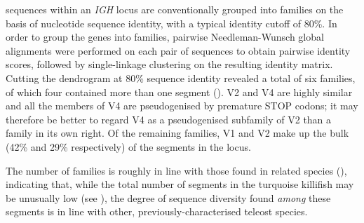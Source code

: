 	\vh sequences within an \textit{IGH} locus are conventionally grouped into families on the basis of nucleotide sequence identity, with a typical identity cutoff of 80\%. In order to group the \Nfu \vh genes into families, pairwise Needleman-Wunsch global alignments were performed on each pair of \vh sequences to obtain pairwise identity scores, followed by single-linkage clustering on the resulting identity matrix. Cutting the dendrogram at 80\% sequence identity revealed a total of six \vh families, of which four contained more than one \vh segment (). 	V2 and V4 are highly similar and all the members of V4 are pseudogenised by premature STOP codons; it may therefore be better to regard V4 as a pseudogenised subfamily of V2 than a \vh family in its own right. Of the remaining families, V1 and V2 make up the bulk (42\% and 29\% respectively) of the \vh segments in the locus. 
	
	The number of \vh families is roughly in line with those found in related species (), indicating that, while the total number of \vh segments in the turquoise killifish may be unusually low (see ), the degree of sequence diversity found \textit{among} these segments is in line with other, previously-characterised teleost species. 
	
